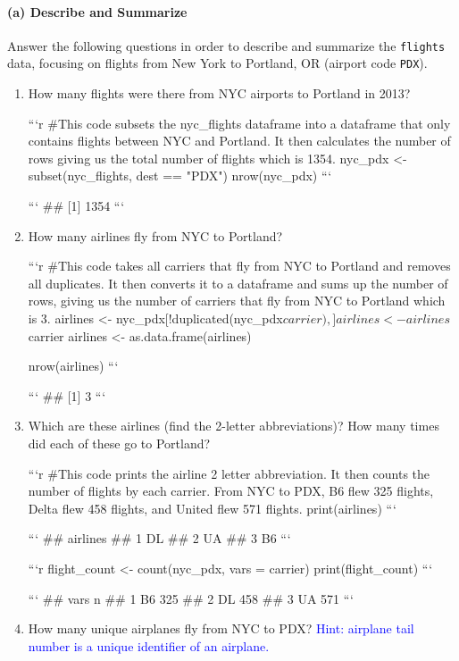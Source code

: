 \documentclass[
]{article}
\begin{document}
\hypertarget{a-describe-and-summarize-1}{%
\paragraph{(a) Describe and
Summarize}\label{a-describe-and-summarize-1}}

Answer the following questions in order to describe and summarize the
\texttt{flights} data, focusing on flights from New York to Portland, OR
(airport code \texttt{PDX}).

\begin{enumerate}
\item How many flights were there from NYC airports to Portland in 2013?

```r
#This code subsets the nyc_flights dataframe into a dataframe that only contains flights between NYC and Portland. It then calculates the number of rows giving us the total number of flights which is 1354. 
nyc_pdx <- subset(nyc_flights, dest == "PDX")
nrow(nyc_pdx)
```

```
## [1] 1354
```
\item How many airlines fly from NYC to Portland?

```r
#This code takes all carriers that fly from NYC to Portland and removes all duplicates. It then converts it to a dataframe and sums up the number of rows, giving us the number of carriers that fly from NYC to Portland which is 3. 
airlines <- nyc_pdx[!duplicated(nyc_pdx$carrier),]
airlines <- airlines$carrier
airlines <- as.data.frame(airlines)

nrow(airlines)
```

```
## [1] 3
```
\item Which are these airlines (find the 2-letter abbreviations)?  How many times did each of these go to Portland?

```r
#This code prints the airline 2 letter abbreviation. It then counts the number of flights by each carrier. From NYC to PDX, B6 flew 325 flights, Delta flew 458 flights, and United flew 571 flights. 
print(airlines)
```

```
##   airlines
## 1       DL
## 2       UA
## 3       B6
```

```r
flight_count <- count(nyc_pdx, vars = carrier)
print(flight_count)
```

```
##   vars   n
## 1   B6 325
## 2   DL 458
## 3   UA 571
```
\item How many unique airplanes fly from NYC to PDX?
\textcolor{blue}{Hint: airplane tail number is a unique identifier of an airplane.}


\end{enumerate}
\end{document}
